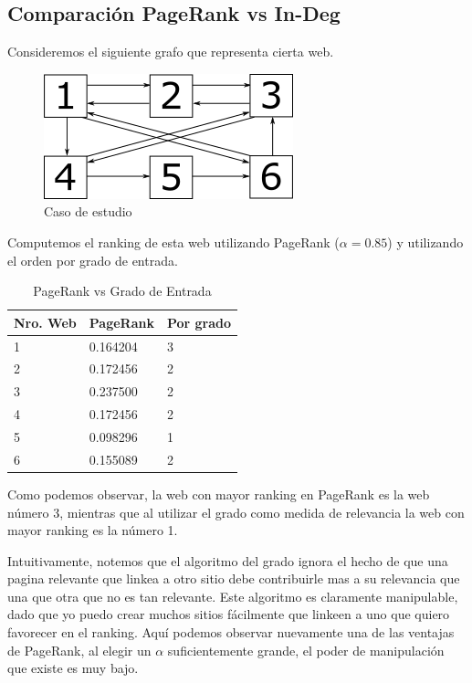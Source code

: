 \pagebreak
\subsection{Comparación PageRank vs In-Deg}

Consideremos el siguiente grafo que representa cierta web.

\begin{figure}[H]
\centering
\includegraphics[scale=1]{images/grafo.png}
\caption{Caso de estudio}
\label{casoEst}
\end{figure}

Computemos el ranking de esta web utilizando PageRank ($\alpha = 0.85$) y utilizando el orden por grado de entrada.

\begin{table}[H]
\centering
\begin{tabular}{lll}
\hline
Nro. Web & PageRank & Por grado \\ \hline
1        & 0.164204 & 3         \\
2        & 0.172456 & 2         \\
3        & 0.237500 & 2         \\
4        & 0.172456 & 2         \\
5        & 0.098296 & 1         \\
6        & 0.155089 & 2         \\ \hline
\end{tabular}
\caption{PageRank vs Grado de Entrada}
\end{table}

Como podemos observar, la web con mayor ranking en PageRank es la web número 3, mientras que al utilizar el grado como medida de relevancia la web con mayor ranking es la número 1.

Intuitivamente, notemos que el algoritmo del grado ignora el hecho de que una pagina relevante que linkea a otro sitio debe contribuirle mas a su relevancia que una que otra que no es tan relevante. Este algoritmo es claramente manipulable, dado que yo puedo crear muchos sitios fácilmente que linkeen a uno que quiero favorecer en el ranking. Aquí podemos observar nuevamente una de las ventajas de PageRank, al elegir un $\alpha$ suficientemente grande, el poder de manipulación que existe es muy bajo.